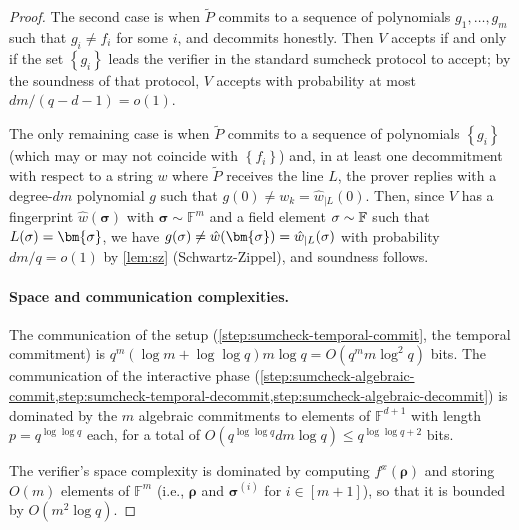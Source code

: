 \documentclass[10pt,a4paper]{article}
\newif\iflipics\lipicsfalse
\theoremstyle{definition}
\newcommand{\field}{\mathbb{F}}
\renewcommand{\set}[1]{\left\{#1\right\}}
\newcommand{\pcommitlength}{p}
\newcommand{\dimension}{m}
\newcommand{\degree}{d}
\newcommand{\fieldsize}{q}
\newcommand{\fingerprinttuple}{\bm{\rho}}
\newcommand{\Fingerprinttuple}{\bm{\sigma}}
\renewcommand{\line}{L}
\def\rfe#1{
    \ifnum#1=1
        \rho
    \else
    \ifnum#1=2
        \sigma
    \else
    \fi\fi
}
\begin{document}
\begin{proof}
    The second case is when $\widetilde P$ commits to a sequence of polynomials $g_1, \ldots, g_\dimension$ such that $g_i \neq f_i$ for some $i$, and decommits honestly. Then $V$ accepts if and only if the set $\set{g_i}$ leads the verifier in the standard sumcheck protocol to accept; by the soundness of that protocol, $V$ accepts with probability at most $\degree\dimension/(\fieldsize - \degree - 1) = o(1)$.
    
    The only remaining case is when $\widetilde P$ commits to a sequence of polynomials $\set{g_i}$ (which may or may not coincide with $\set{f_i}$) and, in at least one decommitment with respect to a string $w$ where $\widetilde P$ receives the line $\line$, the prover replies with a degree-$\degree\dimension$ polynomial $g$ such that $g(0) \neq w_k = \hat w_{|\line}(0)$. Then, since $V$ has a fingerprint $\hat w(\Fingerprinttuple)$ with $\Fingerprinttuple \sim \field^\dimension$ and a field element $\rfe2 \sim \field$ such that $\line(\rfe2) = \Fingerprinttuple$, we have $g(\rfe2) \neq \hat w(\Fingerprinttuple) =  \hat w_{|\line}(\rfe2)$ with probability $\degree\dimension/\fieldsize = o(1)$ by \cref{lem:sz} (Schwartz-Zippel), and soundness follows.
   
   \paragraph*{Space and communication complexities\iflipics\else.\fi} The communication of the setup (\cref{step:sumcheck-temporal-commit}, the temporal commitment) is $\fieldsize^\dimension (\log \dimension + \log\log \fieldsize) \dimension \log \fieldsize = O(\fieldsize^\dimension \dimension \log^2 \fieldsize)$ bits. The communication of the interactive phase (\cref{step:sumcheck-algebraic-commit,step:sumcheck-temporal-decommit,step:sumcheck-algebraic-decommit}) is dominated by the $\dimension$ algebraic commitments to elements of $\field^{\degree + 1}$ with length $\pcommitlength = \fieldsize^{\log\log \fieldsize}$ each, for a total of $O(\fieldsize^{\log\log \fieldsize} \degree \dimension \log \fieldsize) \leq \fieldsize^{\log\log \fieldsize + 2}$ bits.
   
   The verifier's space complexity is dominated by computing $f^x(\fingerprinttuple)$ and storing $O(\dimension)$ elements of $\field^\dimension$ (i.e., $\fingerprinttuple$ and $\Fingerprinttuple^{(i)}$ for $i \in [\dimension + 1]$), so that it is bounded by $O(\dimension^2 \log \fieldsize)$.
\end{proof}
\end{document}
